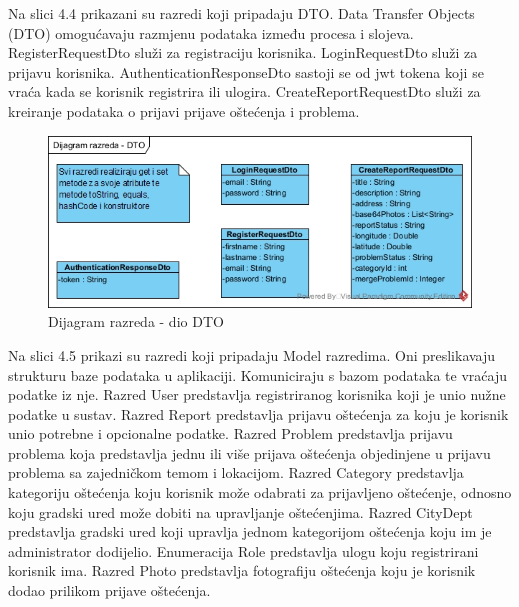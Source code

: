 Na slici 4.4 prikazani su razredi koji pripadaju DTO. Data Transfer Objects (DTO) omogućavaju
razmjenu podataka između procesa i slojeva. RegisterRequestDto služi za registraciju korisnika. 
LoginRequestDto služi za prijavu korisnika. AuthenticationResponseDto sastoji se od jwt tokena koji se vraća
kada se korisnik registrira ili ulogira. CreateReportRequestDto služi za kreiranje podataka o prijavi prijave
oštećenja i problema.

\begin{figure}[H]
	\includegraphics[scale=0.60]{slike/DR-DTO.jpg} %
	\centering
	\caption{Dijagram razreda - dio DTO}
	\label{fig:DijagramRazredaDTO}
\end{figure}

Na slici 4.5 prikazi su razredi koji pripadaju Model razredima. Oni preslikavaju strukturu baze podataka
u aplikaciji. Komuniciraju s bazom podataka te vraćaju podatke iz nje. Razred User predstavlja registriranog
korisnika koji je unio nužne podatke u sustav. Razred Report predstavlja prijavu oštećenja za koju je korisnik
unio potrebne i opcionalne podatke. Razred Problem predstavlja prijavu problema koja predstavlja jednu ili više
prijava oštećenja objedinjene u prijavu problema sa zajedničkom temom i lokacijom. Razred Category predstavlja
kategoriju oštećenja koju korisnik može odabrati za prijavljeno oštećenje, odnosno koju gradski ured može dobiti
na upravljanje oštećenjima. Razred CityDept predstavlja gradski ured koji upravlja jednom kategorijom oštećenja 
koju im je administrator dodijelio. Enumeracija Role predstavlja ulogu koju registrirani korisnik ima. Razred 
Photo predstavlja fotografiju oštećenja koju je korisnik dodao prilikom prijave oštećenja. 

